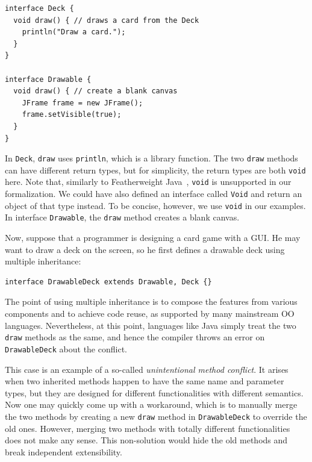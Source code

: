 \vspace{3pt}\begin{lstlisting}
interface Deck {
  void draw() { // draws a card from the Deck
    println("Draw a card.");
  }
}

interface Drawable {
  void draw() { // create a blank canvas
    JFrame frame = new JFrame();
    frame.setVisible(true);
  }
}
\end{lstlisting}\vspace{3pt}
In \lstinline|Deck|,
\lstinline|draw| uses \lstinline|println|, which is a
library function. 
The two \lstinline|draw| methods can have different return types, but for simplicity, 
the return types are both \lstinline|void| here. Note that, similarly to
Featherweight Java~\cite{Igarashi01FJ}, \lstinline|void| is
unsupported in our formalization. We could have also defined an interface called \lstinline|Void|
and return an object of that type instead. To be concise, however, we
use \lstinline|void| in our examples.
In interface \lstinline|Drawable|, the \lstinline|draw| method
creates a blank canvas.

Now, suppose that a programmer is designing a
card game with a GUI. He may want to draw a deck on the screen, so he first defines a drawable
deck using multiple inheritance:

\vspace{3pt}\begin{lstlisting}
interface DrawableDeck extends Drawable, Deck {} 
\end{lstlisting}\vspace{3pt}
The point of using multiple inheritance is to compose the features from various 
components and to achieve code reuse, as supported by many mainstream OO
languages. Nevertheless, at this point, languages like Java simply treat the two \lstinline|draw| methods
as the same, and hence the compiler throws an error
on \lstinline|DrawableDeck| about the conflict.

This case is an example of a so-called \textit{unintentional method conflict}. It arises when two inherited methods happen to have
the same name and parameter types, but they are designed for different functionalities with different semantics.
Now one may quickly come up with a workaround, which is to manually
merge the two methods by creating a new \lstinline|draw| method in \lstinline|DrawableDeck| to
override the old ones. However, merging two methods with totally different functionalities does not make any sense.
This non-solution would hide the
old methods and break independent extensibility.

